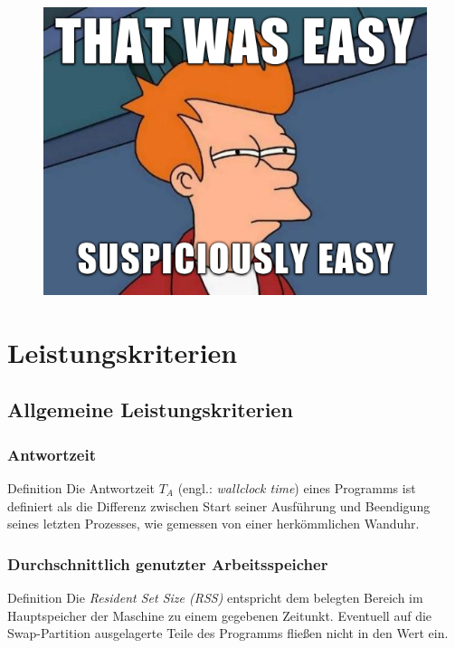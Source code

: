 \documentclass[presentation, shownotes]{beamer}
\begin{document}
\begin{frame}[plain]{}
\begin{figure}
\centering
\includegraphics[height=.7\textheight]{suspiciously_easy}
\end{figure}
\end{frame}

\section{Leistungskriterien}

\begin{frame}
\tableofcontents[currentsection]
\end{frame}

\setcounter{subsection}{1}
\subsection{Allgemeine Leistungskriterien}

\begin{frame}
\frametitle{Antwortzeit}
    \begin{block}{Definition}
    Die Antwortzeit $T_A$ (engl.: \textit{wallclock time}) eines Programms ist definiert als die Differenz zwischen Start seiner Ausführung und Beendigung seines letzten Prozesses, wie gemessen von einer herkömmlichen Wanduhr.
    \end{block}
\end{frame}

\begin{frame}
\frametitle{Durchschnittlich genutzter Arbeitsspeicher}
    \begin{block}{Definition}
    Die \textit{Resident Set Size (RSS)} entspricht dem belegten Bereich im Hauptspeicher der Maschine zu einem gegebenen Zeitunkt. Eventuell auf die Swap-Partition ausgelagerte Teile des Programms fließen nicht in den Wert ein.
    \end{block}
\end{frame}
\end{document}

